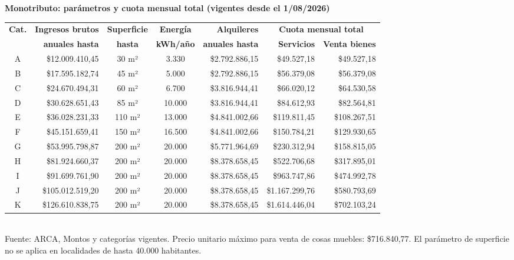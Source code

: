 \begin{center}
\footnotesize
\textbf{Monotributo: parámetros y cuota mensual total (vigentes desde el 1/08/2026)}\\[3pt]
\setlength{\tabcolsep}{3.5pt}
\begin{tabular}{|c|r|c|c|r|r|r|}
\hline
\textbf{Cat.} & \textbf{Ingresos brutos} & \textbf{Superficie} & \textbf{Energía} &
\textbf{Alquileres} & \multicolumn{2}{c|}{\textbf{Cuota mensual total}} \\
 & \textbf{anuales hasta} & \textbf{hasta} & \textbf{kWh/año} & \textbf{anuales hasta} &
\textbf{Servicios} & \textbf{Venta bienes} \\ \hline
A & \$12.009.410,45 & 30 m² & 3.330 & \$2.792.886,15 & \$49.527,18 & \$49.527,18 \\ \hline
B & \$17.595.182,74 & 45 m² & 5.000 & \$2.792.886,15 & \$56.379,08 & \$56.379,08 \\ \hline
C & \$24.670.494,31 & 60 m² & 6.700 & \$3.816.944,41 & \$66.020,12 & \$64.530,58 \\ \hline
D & \$30.628.651,43 & 85 m² & 10.000 & \$3.816.944,41 & \$84.612,93 & \$82.564,81 \\ \hline
E & \$36.028.231,33 & 110 m² & 13.000 & \$4.841.002,66 & \$119.811,45 & \$108.267,51 \\ \hline
F & \$45.151.659,41 & 150 m² & 16.500 & \$4.841.002,66 & \$150.784,21 & \$129.930,65 \\ \hline
G & \$53.995.798,87 & 200 m² & 20.000 & \$5.771.964,69 & \$230.312,94 & \$158.815,05 \\ \hline
H & \$81.924.660,37 & 200 m² & 20.000 & \$8.378.658,45 & \$522.706,68 & \$317.895,01 \\ \hline
I & \$91.699.761,90 & 200 m² & 20.000 & \$8.378.658,45 & \$963.747,86 & \$474.992,78 \\ \hline
J & \$105.012.519,20 & 200 m² & 20.000 & \$8.378.658,45 & \$1.167.299,76 & \$580.793,69 \\ \hline
K & \$126.610.838,75 & 200 m² & 20.000 & \$8.378.658,45 & \$1.614.446,04 & \$702.103,24 \\ \hline
\end{tabular}\\[2pt]
{\scriptsize Fuente: ARCA, Montos y categorías vigentes. Precio unitario máximo para venta de
cosas muebles: \$716.840,77. El parámetro de superficie no se aplica en localidades de hasta
40.000 habitantes.}
\end{center}

